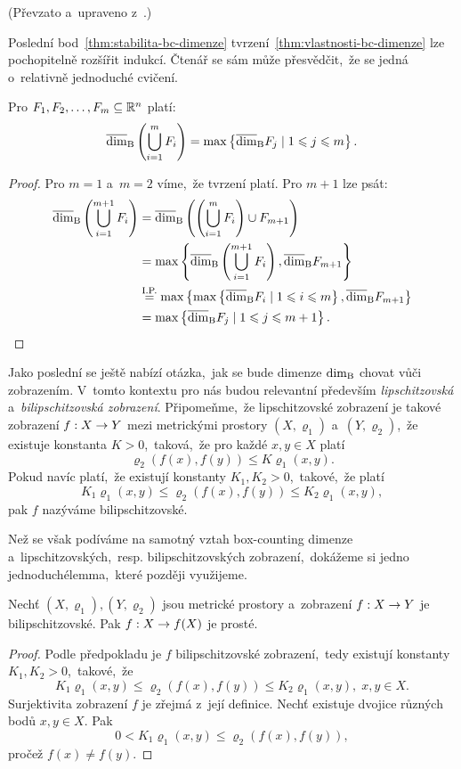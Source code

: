 (Převzato a~upraveno z~\citep[str. 35]{Falconer2014}.)

Poslední bod~\ref{thm:stabilita-bc-dimenze} tvrzení~\ref{thm:vlastnosti-bc-dimenze} lze pochopitelně rozšířit indukcí. Čtenář se sám může přesvědčit,~že se jedná o~relativně jednoduché cvičení.
\begin{corollary}\label{cor:stabilita-bc-dimenze-obecne}
    Pro $F_1,F_2,\ldots,F_m\subseteq\mathbb{R}^n$ platí:
    \[\overline{\dim}_\textup{B}\left(\bigcup_{i=1}^m F_i\right)=\max\left\{\overline{\dim}_\textup{B}{F_j}\mid 1\leqslant j\leqslant m\right\}.\]
\end{corollary}
\begin{proof}
    Pro $m=1$ a~$m=2$ víme,~že tvrzení platí. Pro $m+1$ lze psát:
    \begin{align*}
        \overline{\dim}_\textup{B}\left(\bigcup_{i=1}^{m+1}F_i\right)&=\overline{\dim}_\textup{B}\left(\left(\bigcup_{i=1}^{m}F_i\right)\cup F_{m+1}\right)\\
        &=\max\left\{\overline{\dim}_\textup{B}\left(\bigcup_{i=1}^{m+1}F_i\right),\overline{\dim}_\textup{B}{F_{m+1}}\right\}\\
        &\stackrel{\text{I.P.}}{=}\max\left\{\max\left\{\overline{\dim}_\textup{B}{F_i}\mid 1\leqslant i\leqslant m\right\},\overline{\dim}_\textup{B}{F_{m+1}}\right\}\\
        &=\max\left\{\overline{\dim}_\textup{B}{F_j}\mid 1\leqslant j\leqslant m+1\right\}.
    \end{align*}
\end{proof}

Jako poslední se ještě nabízí otázka,~jak se bude dimenze $\operatorname{dim_B}$ chovat vůči zobrazením. V~tomto kontextu pro nás budou relevantní především \emph{lipschitzovská} a~\emph{bilipschitzovská zobrazení}. Připomeňme,~že lipschitzovské zobrazení je takové zobrazení $f:X \rightarrow Y$ mezi metrickými prostory $(X,\varrho_1)$ a~$(Y,\varrho_2)$,~že existuje konstanta $K>0$,~taková,~že pro každé $x,y\in X$ platí
\[\varrho_2(f(x),f(y))\leqslant K\varrho_1(x,y).\]
Pokud navíc platí,~že existují konstanty $K_1,K_2>0$,~takové,~že platí
\[K_1\varrho_1(x,y)\leqslant\varrho_2(f(x),f(y))\leqslant K_2\varrho_1(x,y),\]
pak $f$ nazýváme bilipschitzovské.

Než se však podíváme na samotný vztah box-counting dimenze a~lipschitzovských,~resp. bilipschitzovských zobrazení,~dokážeme si jedno jednoduché\linebreak{}lemma,~které později využijeme.
\begin{lemma}\label{lem:lipschitzovska-zobrazeni-a-bijekce}
    Nechť $(X,\varrho_1),(Y,\varrho_2)$ jsou metrické prostory a~zobrazení $f:X \rightarrow Y$ je bilipschitzovské. Pak $f:X \rightarrow f(X)$ je prosté.
\end{lemma}
\begin{proof}
    Podle předpokladu je $f$ bilipschitzovské zobrazení,~tedy existují konstanty $K_1,K_2>0$,~takové,~že
    \[K_1\varrho_1(x,y)\leqslant\varrho_2(f(x),f(y))\leqslant K_2\varrho_1(x,y),\;x,y\in X.\]
    Surjektivita zobrazení $f$ je zřejmá z~její definice. Nechť existuje dvojice různých bodů $x,y\in X$. Pak
    \[0<K_1\varrho_1(x,y)\leqslant\varrho_2(f(x),f(y)),\]
    pročež $f(x)\neq f(y)$.
\end{proof}

